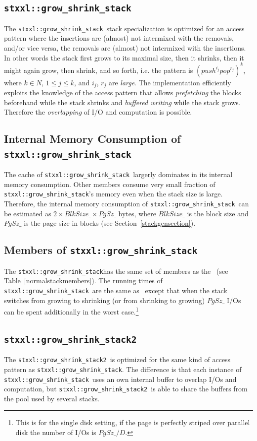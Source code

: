 \documentclass[twoside]{book}
\begin{document}
\newcommand{\xgsstack}{\texttt{stxxl::grow\_shrink\_stack}}
\subsection{\xgsstack}
The \xgsstack\ stack specialization is optimized for an
access pattern where the insertions are (almost) not intermixed with
the removals, and/or vice versa, the removals are (almost) not
intermixed with the insertions. In other words the stack first grows
to its maximal size, then it shrinks, then it might again grow, then
shrink, and so forth, i.e. the pattern is
$(push^{i_j}pop^{r_j})^k$, where $k \in N$, $1\leq j\leq k$, and
$i_j$, $r_j$ are \emph{large}. 
The implementation efficiently exploits the knowledge of the access
pattern that allows \emph{prefetching} the blocks beforehand while the stack
shrinks and \emph{buffered writing} while the stack grows. Therefore
the \emph{overlapping} of I/O and computation is possible.

\subsection*{Internal Memory Consumption of \xgsstack}
The cache of \xgsstack\ largerly dominates in its internal memory
consumption. Other members consume very small fraction of
\xgsstack 's 
memory even when the stack size is large. Therefore, the internal
memory consumption of \xgsstack\ can be estimated as
$2 \times BlkSize\_ \times PgSz\_$ bytes, where $BlkSize\_$ is the
block size and $PgSz\_$ is the page size in blocks (see
Section~\ref{stackgensection}). 

\subsection*{Members of \xgsstack}
The \xgsstack has the same set of members as the \xnormalstack\  (see
Table~\ref{normalstackmembers}). The running times of \xgsstack\ are the
same as \xnormalstack\ except that when the stack switches from
growing to shrinking (or from shrinking to growing) $PgSz\_$ I/Os can
be spent additionally in the worst case.\footnote{This is for the single
disk setting, if the page is perfectly striped over parallel disk the
number of I/Os is $PgSz\_/D$.}

\newcommand{\xgsstacktwo}{\texttt{stxxl::grow\_shrink\_stack2}}
\subsection{\xgsstacktwo}
The \xgsstacktwo\ is optimized for the same kind of access pattern as
\xgsstack. The difference is that each instance of \xgsstack\ uses
an own internal buffer to overlap I/Os and computation, but
\xgsstacktwo\ is able to share the buffers from the pool used by
several stacks. 
\end{document}
